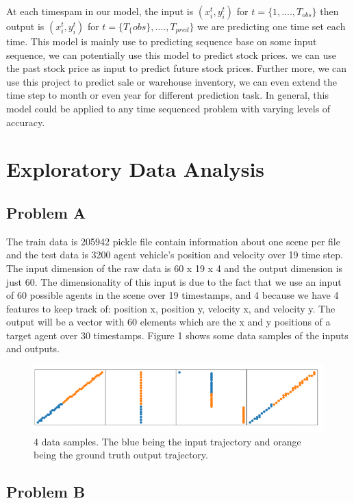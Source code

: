 \documentclass{article}
\begin{document}
At each timespam in our model, the input is $(x^{t}_{i},y^{t}_{i})$ for $t=\{1,....,T_{obs}\}$ then output is $(x^{t}_{i},y^{t}_{i})$ for $t=\{T_\{obs\},....,T_{pred}\}$ we are predicting one time set each time. This model is mainly use to predicting sequence base on some input sequence, we can potentially use this model to predict stock prices. we can use the past stock price as input to predict future stock prices. Further more, we can use this project to predict sale or warehouse inventory, we can even extend the time step to month or even year for different prediction task. In general, this model could be applied to any time sequenced problem with varying levels of accuracy.
\section{Exploratory Data Analysis}


\subsection{Problem A}
The train data is 205942 pickle file contain information about one scene per file and the test data is 3200 agent vehicle's position and velocity over 19 time step.  \\
The input dimension of the raw data is 60 x 19 x 4 and the output dimension is just 60. The dimensionality of this input is due to the fact that we use an input of 60 possible agents in the scene over 19 timestamps, and 4 because we have 4 features to keep track of: position x, position y, velocity x, and velocity y. The output will be a vector with 60 elements which are the x and y positions of a target agent over 30 timestamps. Figure 1 shows some data samples of the inputs and outputs. 
\begin{figure}[H]
    \centering
    \includegraphics[scale=0.7]{data_smaple.png}
    \caption{4 data samples. The blue being the input trajectory and orange being the ground truth output trajectory.}
    \label{fig:sample_data_points}
\end{figure}
\subsection{Problem B}
\end{document}
